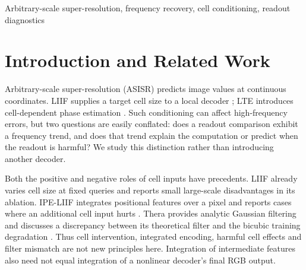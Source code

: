 \begin{abstract}
In arbitrary-scale super-resolution, cell inputs are often motivated
by the size of a target pixel, but frequency ordering alone does
not establish what this readout computes. We evaluate recovery in
low-resolution Nyquist units and distinguish paired training ablations
from fixed-weight cell interventions. Normalisation reduces cross-scale
variation in all nine primary model--dataset groups and all 27 groups
including additional seeds; the original strict collapse criterion still
fails, and its outcome depends on energy pooling. Coarse readout-loss
ordering replicates in four architecture--seed groups, yet a footprint
score has exactly the ranks of band index and scale averaging fails
function similarity in every group. A separately calibrated,
observation-only forecast also misses harmful interventions and does
not improve on a magnitude/spectrum baseline. These results support a
frequency-based evaluation coordinate while delimiting the tested readout
interpretations and instance-level guidance.
\end{abstract}
\begin{keywords}
Arbitrary-scale super-resolution, frequency recovery, cell conditioning,
readout diagnostics
\end{keywords}

\section{Introduction and Related Work}
\label{sec:intro}
Arbitrary-scale super-resolution (ASISR) predicts image values at continuous
coordinates. LIIF supplies a target cell size to a local decoder
\cite{chen2021liif}; LTE introduces cell-dependent phase estimation
\cite{lee2022lte}. Such conditioning can affect high-frequency errors,
but two questions are easily conflated: does a readout comparison exhibit
a frequency trend, and does that trend explain the computation or predict
when the readout is harmful? We study this distinction rather than
introducing another decoder.

Both the positive and negative roles of cell inputs have precedents.
LIIF already varies cell size at fixed queries and reports small
large-scale disadvantages in its ablation. IPE-LIIF integrates positional
features over a pixel and reports cases where an additional cell input
hurts \cite{liu2021ipe}. Thera provides analytic Gaussian filtering and
discusses a discrepancy between its theoretical filter and the bicubic
training degradation \cite{becker2025thera}. Thus cell intervention,
integrated encoding, harmful cell effects and filter mismatch are not
new principles here. Integration of intermediate features also need
not equal integration of a nonlinear decoder's final RGB output.

